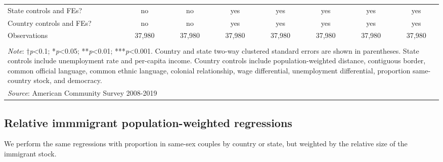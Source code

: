 \documentclass[
  11pt,
]{article}
\begin{document}
\begin{table}[H]
\begin{tabular}{@{\extracolsep{5pt}}lccccccc}
State controls and FEs? & no & no & yes & yes & yes & yes & yes \\ 
Country controls and FEs? & no & no & yes & yes & yes & yes & yes \\ 
Observations & 37,980 & 37,980 & 37,980 & 37,980 & 37,980 & 37,980 & 37,980 \\ 
\hline 
\hline \\[-1.8ex] 
\multicolumn{8}{l}{\parbox[t]{\textwidth}{\textit{Note}: †\textit{p}<0.1; *\textit{p}<0.05; **\textit{p}<0.01; ***\textit{p}<0.001. Country and state two-way clustered standard errors are shown in parentheses. State controls include unemployment rate and per-capita income. Country controls include population-weighted distance, contiguous border, common official language, common ethnic language, colonial relationship, wage differential, unemployment differential, proportion same-country stock, and democracy.}} \\ 
\multicolumn{8}{l}{\textit{Source}: American Community Survey 2008-2019} \\ 
\end{tabular} 
\end{table}

\newpage

\hypertarget{relative-immmigrant-population-weighted-regressions}{%
\subsection{Relative immmigrant population-weighted regressions}\label{relative-immmigrant-population-weighted-regressions}}

We perform the same regressions with proportion in same-sex couples by country or state, but weighted by the relative size of the immigrant stock.
\end{document}
